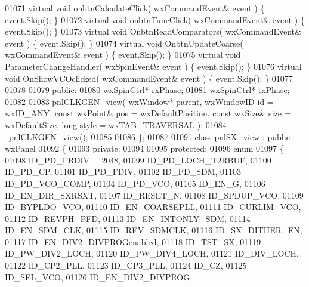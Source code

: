 \begin{DoxyCode}
01071         \textcolor{keyword}{virtual} \textcolor{keywordtype}{void} onbtnCalculateClick( wxCommandEvent& event ) \{ \textcolor{keyword}{event}.Skip(); \}
01072         \textcolor{keyword}{virtual} \textcolor{keywordtype}{void} onbtnTuneClick( wxCommandEvent& event ) \{ \textcolor{keyword}{event}.Skip(); \}
01073         \textcolor{keyword}{virtual} \textcolor{keywordtype}{void} OnbtnReadComparators( wxCommandEvent& event ) \{ \textcolor{keyword}{event}.Skip(); \}
01074         \textcolor{keyword}{virtual} \textcolor{keywordtype}{void} OnbtnUpdateCoarse( wxCommandEvent& event ) \{ \textcolor{keyword}{event}.Skip(); \}
01075         \textcolor{keyword}{virtual} \textcolor{keywordtype}{void} ParameterChangeHandler( wxSpinEvent& event ) \{ \textcolor{keyword}{event}.Skip(); \}
01076         \textcolor{keyword}{virtual} \textcolor{keywordtype}{void} OnShowVCOclicked( wxCommandEvent& event ) \{ \textcolor{keyword}{event}.Skip(); \}
01077         
01078     
01079     \textcolor{keyword}{public}:
01080         wxSpinCtrl* rxPhase;
01081         wxSpinCtrl* txPhase;
01082         
01083         pnlCLKGEN_view( wxWindow* parent, wxWindowID \textcolor{keywordtype}{id} = wxID\_ANY, \textcolor{keyword}{const} wxPoint& pos = wxDefaultPosition,
       \textcolor{keyword}{const} wxSize& size = wxDefaultSize, \textcolor{keywordtype}{long} style = wxTAB\_TRAVERSAL ); 
01084         ~pnlCLKGEN_view();
01085     
01086 \};
01087 
01091 \textcolor{keyword}{class }pnlSX_view : \textcolor{keyword}{public} wxPanel 
01092 \{
01093     \textcolor{keyword}{private}:
01094     
01095     \textcolor{keyword}{protected}:
01096         \textcolor{keyword}{enum}
01097         \{
01098             ID\_PD\_FBDIV = 2048,
01099             ID_PD_LOCH_T2RBUF,
01100             ID_PD_CP,
01101             ID_PD_FDIV,
01102             ID_PD_SDM,
01103             ID_PD_VCO_COMP,
01104             ID_PD_VCO,
01105             ID_EN_G,
01106             ID_EN_DIR_SXRSXT,
01107             ID_RESET_N,
01108             ID_SPDUP_VCO,
01109             ID_BYPLDO_VCO,
01110             ID_EN_COARSEPLL,
01111             ID_CURLIM_VCO,
01112             ID_REVPH_PFD,
01113             ID_EN_INTONLY_SDM,
01114             ID_EN_SDM_CLK,
01115             ID_REV_SDMCLK,
01116             ID_SX_DITHER_EN,
01117             ID_EN_DIV2_DIVPROGenabled,
01118             ID_TST_SX,
01119             ID_PW_DIV2_LOCH,
01120             ID_PW_DIV4_LOCH,
01121             ID_DIV_LOCH,
01122             ID_CP2_PLL,
01123             ID_CP3_PLL,
01124             ID_CZ,
01125             ID_SEL_VCO,
01126             ID_EN_DIV2_DIVPROG,

\end{DoxyCode}
